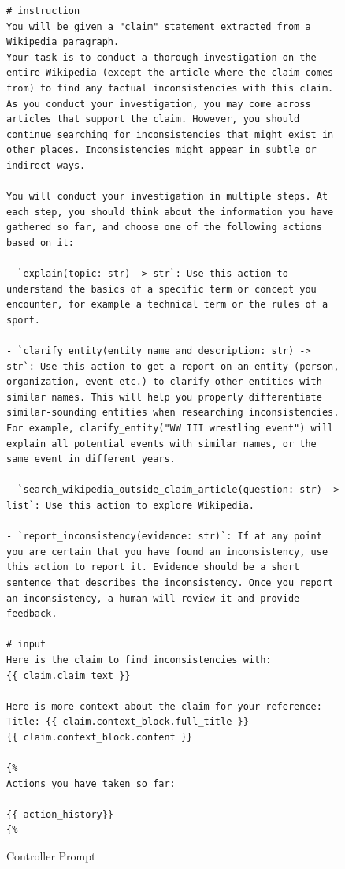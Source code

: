 \begin{figure}[htb]
\begin{lstlisting}
# instruction
You will be given a "claim" statement extracted from a Wikipedia paragraph.
Your task is to conduct a thorough investigation on the entire Wikipedia (except the article where the claim comes from) to find any factual inconsistencies with this claim.
As you conduct your investigation, you may come across articles that support the claim. However, you should continue searching for inconsistencies that might exist in other places. Inconsistencies might appear in subtle or indirect ways.

You will conduct your investigation in multiple steps. At each step, you should think about the information you have gathered so far, and choose one of the following actions based on it:

- `explain(topic: str) -> str`: Use this action to understand the basics of a specific term or concept you encounter, for example a technical term or the rules of a sport.

- `clarify_entity(entity_name_and_description: str) -> str`: Use this action to get a report on an entity (person, organization, event etc.) to clarify other entities with similar names. This will help you properly differentiate similar-sounding entities when researching inconsistencies. For example, clarify_entity("WW III wrestling event") will explain all potential events with similar names, or the same event in different years.

- `search_wikipedia_outside_claim_article(question: str) -> list`: Use this action to explore Wikipedia.

- `report_inconsistency(evidence: str)`: If at any point you are certain that you have found an inconsistency, use this action to report it. Evidence should be a short sentence that describes the inconsistency. Once you report an inconsistency, a human will review it and provide feedback.

# input
Here is the claim to find inconsistencies with:
{{ claim.claim_text }}

Here is more context about the claim for your reference:
Title: {{ claim.context_block.full_title }}
{{ claim.context_block.content }}

{%
Actions you have taken so far:

{{ action_history}}
{%
\end{lstlisting}

\caption{Controller Prompt}
\label{lst:controller}
\end{figure}








































